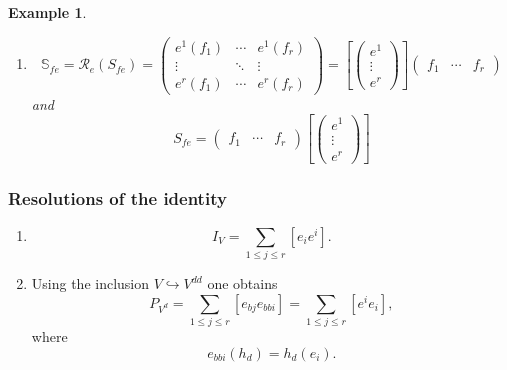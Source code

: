 \documentclass[aps,preprint]{revtex4}
\newtheorem{example}[theorem]{Example}
\begin{document}
\begin{example}
\begin{enumerate}
\item 
\begin{equation}
\mathbb{S}_{fe}=\mathcal{R}_{e}\left( S_{fe}\right) =\left( 
\begin{array}{ccc}
e^{1}\left( f_{1}\right) & \cdots & e^{1}\left( f_{r}\right) \\ 
\vdots & \ddots & \vdots \\ 
e^{r}\left( f_{1}\right) & \cdots & e^{r}\left( f_{r}\right)%
\end{array}%
\right) =\left[ \left( 
\begin{array}{c}
e^{1} \\ 
\vdots \\ 
e^{r}%
\end{array}%
\right) \right] \left( 
\begin{array}{ccc}
f_{1} & \cdots & f_{r}%
\end{array}%
\right)
\end{equation}%
and 
\begin{equation}
S_{fe}=\left( 
\begin{array}{ccc}
f_{1} & \cdots & f_{r}%
\end{array}%
\right) \left[ \left( 
\begin{array}{c}
e^{1} \\ 
\vdots \\ 
e^{r}%
\end{array}%
\right) \right]
\end{equation}
\end{enumerate}
\end{example}

\subsubsection{Resolutions of the identity \label{Resolutions of the
Identity}}

\begin{enumerate}
\item 
\begin{equation}
I_{V}=\sum_{1\leq j\leq r}\left[ e_{i}e^{i}\right] .
\end{equation}

\item Using the inclusion $V\hookrightarrow V^{dd}$ one obtains 
\begin{equation}
P_{V^{d}}=\sum_{1\leq j\leq r}\left[ e_{bj}e_{bbi}\right] =\sum_{1\leq j\leq
r}\left[ e^{i}e_{i}\right] ,
\end{equation}%
where 
\begin{equation}
e_{bbi}\left( h_{d}\right) =h_{d}\left( e_{i}\right) .
\end{equation}
\end{enumerate}
\end{document}
